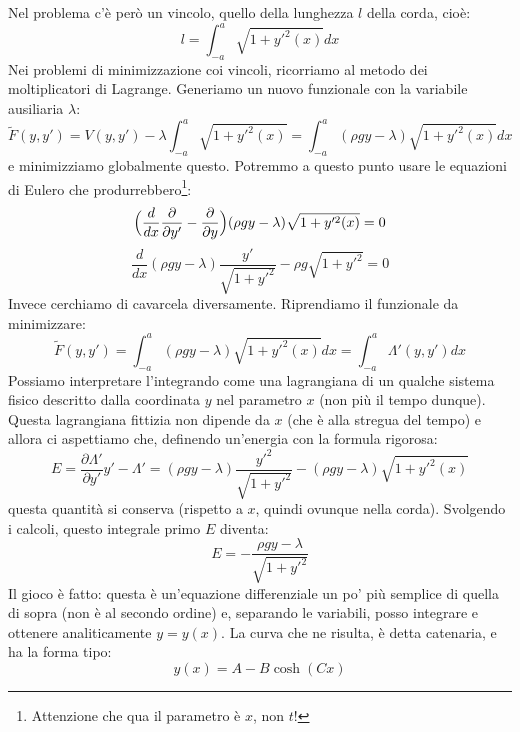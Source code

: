\documentclass[a4paper,openany]{article}
\begin{document}
	Nel problema c'è però un vincolo, quello della lunghezza $l$ della corda, cioè:
	\begin{equation}\label{key}
		l = \int_{-a}^{a}\sqrt{1+y'^2(x)}dx
	\end{equation}
	Nei problemi di minimizzazione coi vincoli, ricorriamo al metodo dei moltiplicatori di Lagrange. Generiamo un nuovo funzionale con la variabile ausiliaria $\lambda$:
	\begin{equation}\label{key}
		\tilde{F}(y,y') = V(y,y')-\lambda\int_{-a}^{a}\sqrt{1+y'^2(x)} =\int_{-a}^{a}(\rho g y-\lambda)\sqrt{1+y'^2(x)}  dx
	\end{equation}
	e minimizziamo globalmente questo. Potremmo a questo punto usare le equazioni di Eulero che produrrebbero\footnote{Attenzione che qua il parametro è $x$, non $t$!}:
	\begin{equation}\label{key}
		\Bigl(\dfrac{d}{dx}\dfrac{\partial}{\partial y'}-\dfrac{\partial}{\partial y}\Bigl)(\rho g y-\lambda)\sqrt{1+y'^2(x)} = 0
	\end{equation}
	\begin{equation}\label{key}
		\dfrac{d}{dx}(\rho g y -\lambda)\dfrac{y'}{\sqrt{1+y'^2}}-\rho g \sqrt{1+y'^2} =0
	\end{equation}
	Invece cerchiamo di cavarcela diversamente. Riprendiamo il funzionale da minimizzare:
	\begin{equation}\label{key}
		\tilde{F}(y,y') =\int_{-a}^{a}(\rho g y-\lambda)\sqrt{1+y'^2(x)}  dx =\int_{-a}^{a} \Lambda'(y,y')dx
	\end{equation}
	Possiamo interpretare l'integrando come una lagrangiana di un qualche sistema fisico descritto dalla coordinata $y$ nel parametro $x$ (non più il tempo dunque). Questa lagrangiana fittizia non dipende da $x$ (che è alla stregua del tempo) e allora ci aspettiamo che, definendo un'energia con la formula rigorosa:
	\begin{equation}\label{key}
		E = \dfrac{\partial \Lambda'}{\partial y'}y'-\Lambda' = (\rho g y -\lambda)\dfrac{y'^2}{\sqrt{1+y'^2}} - (\rho g y-\lambda)\sqrt{1+y'^2(x)} 
	\end{equation}
	questa quantità si conserva (rispetto a $x$, quindi ovunque nella corda). Svolgendo i calcoli, questo integrale primo $E$ diventa:
	\begin{equation}\label{key}
		E = - \dfrac{\rho g y - \lambda}{\sqrt{1+y'^2}}
	\end{equation}
	Il gioco è fatto: questa è un'equazione differenziale un po' più semplice di quella di sopra (non è al secondo ordine) e, separando le variabili, posso integrare e ottenere analiticamente $y=y(x)$. La curva che ne risulta, è detta catenaria, e ha la forma tipo:
	\begin{equation}\label{key}
		y(x) = A - B\cosh(Cx)
	\end{equation}
	
\end{document}
